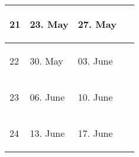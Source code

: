 \documentclass[
  a4wide,
  smallheadings
]{article}
\begin{document}
\begin{supertabular}{|p{1.5cm}|p{2cm}|p{2cm}|p{8cm}|}
    21 & 23. May & 27. May &
    
     \begin{compactitem}
        \item
    \end{compactitem} \\
    
    \hline
    
    22 & 30. May & 03. June &
    
     \begin{compactitem}
        \item
    \end{compactitem} \\
    
    \hline
    
    23 & 06. June & 10. June &
    
     \begin{compactitem}
        \item
    \end{compactitem} \\
    
    \hline
    
    24 & 13. June & 17. June &
    
    \begin{compactitem}
        \item
    \end{compactitem} \\
    
    \hline

\end{supertabular}
    
\end{document}
